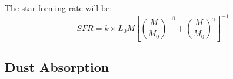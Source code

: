 The star forming rate will be:
  \begin{equation}
  SFR = k \times L_{0} M \left[ \left( \frac{M}{M_0}\right)^{-\beta} 
		   + \left( \frac{M}{M_0}\right)^{\gamma} 
               \right]^{-1}
  \end{equation}

\subsection{Dust Absorption}

